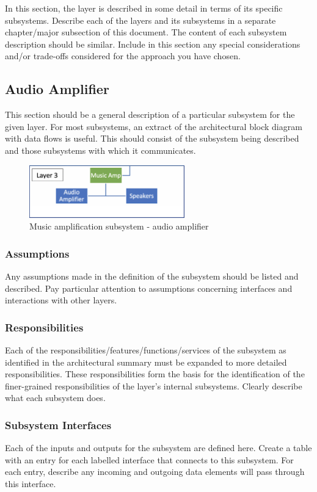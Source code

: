 In this section, the layer is described in some detail in terms of its specific subsystems. Describe each of the layers and its subsystems in a separate chapter/major subsection of this document. The content of each subsystem description should be similar. Include in this section any special considerations and/or trade-offs considered for the approach you have chosen.

\subsection{Audio Amplifier}
This section should be a general description of a particular subsystem for the given layer. For most subsystems, an extract of the architectural block diagram with data flows is useful. This should consist of the subsystem being described and those subsystems with which it communicates.

\begin{figure}[h!]
	\centering
 	\includegraphics[width=0.60\textwidth]{images/subsystem3}
 \caption{Music amplification subsystem - audio amplifier}
\end{figure}

\subsubsection{Assumptions}
Any assumptions made in the definition of the subsystem should be listed and described. Pay particular attention to assumptions concerning interfaces and interactions with other layers.

\subsubsection{Responsibilities}
Each of the responsibilities/features/functions/services of the subsystem as identified in the architectural summary must be expanded to more detailed responsibilities. These responsibilities form the basis for the identification of the finer-grained responsibilities of the layer's internal subsystems. Clearly describe what each subsystem does.

\subsubsection{Subsystem Interfaces}
Each of the inputs and outputs for the subsystem are defined here. Create a table with an entry for each labelled interface that connects to this subsystem. For each entry, describe any incoming and outgoing data elements will pass through this interface.

